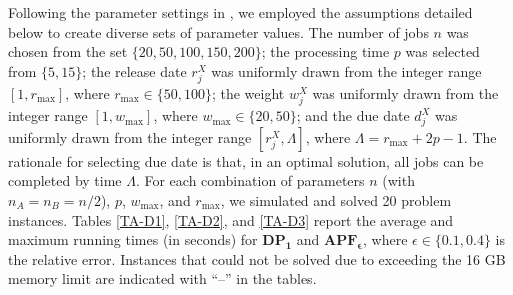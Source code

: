 \documentclass[12pt]{article}
\begin{document}
\begin{sloppypar}
Following the parameter settings in \cite{HallPosner2001OR}, we employed the assumptions detailed below to create diverse sets of parameter values. The number of jobs $n$ was chosen from the set $\{20, 50, 100, 150, 200\}$; the processing time $p$ was selected from $\{5, 15\}$; the release date $r_j^X$ was uniformly drawn from the integer range $[1, r_{\max}]$, where $r_{\max} \in \{50, 100\}$; the weight $w_j^X$ was uniformly drawn from the integer range $[1, w_{\max}]$, where $w_{\max} \in \{20, 50\}$; and the due date $d_j^X$ was uniformly drawn from the integer range $[r_j^X, \Lambda]$, where $\Lambda=r_{\max}+2p-1$. The rationale for selecting due date is that, in an optimal solution, all jobs can be completed by time $\Lambda$. For each combination of parameters $n$ (with $n_A=n_B= n/2$), $p$, $w_{\max}$, and $r_{\max}$, we simulated and solved 20 problem instances. Tables \ref{TA-D1}, \ref{TA-D2}, and \ref{TA-D3} report the average and maximum running times (in seconds) for $\mathbf{DP_1}$ and $\mathbf{APF_{\epsilon}}$, where $\epsilon \in \{0.1, 0.4\}$ is the relative error. Instances that could not be solved due to exceeding the 16 GB memory limit are indicated with ``--'' in the tables.


\end{sloppypar}
\end{document}
